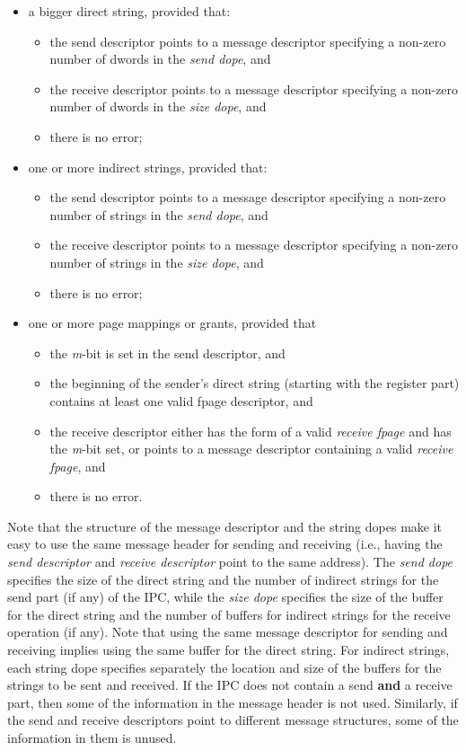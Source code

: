 \begin{itemize}

\item a bigger direct string, provided that:
\begin{itemize}
\item the send descriptor points to a  message descriptor  specifying a
     non-zero number of dwords in the \emph{send dope}, and
\item the receive descriptor points to a message descriptor specifying a
     non-zero number of dwords in the \emph{size dope}, and
\item there is no error;
\end{itemize}

\item one or more indirect strings, provided that:
\begin{itemize}
\item the send descriptor points to a  message descriptor specifying a
     non-zero number of strings in the \emph{send dope}, and
\item the receive descriptor points to a message descriptor specifying a
     non-zero number of strings in the \emph{size dope}, and
\item there is no error;
\end{itemize}

\item one or more page mappings or grants, provided that
\begin{itemize}
\item the \emph{m}-bit is set in the send descriptor, and
\item the beginning of the sender's direct string (starting with the
     register part) contains at least one valid fpage descriptor, and
\item the receive descriptor either has the form of a valid \emph{receive
     fpage} and has the \emph{m}-bit set, or points to a message
     descriptor containing a valid \emph{receive fpage}, and
\item there is no error.
\end{itemize}
\end{itemize}

Note that the structure of the message descriptor and the string dopes
make it easy to use the same message header for sending and receiving
(i.e., having the \emph{send descriptor} and \emph{receive descriptor}
point to the same address). The \emph{send dope} specifies the size of
the direct string and the number of indirect strings for the send part
(if any) of the IPC, while the \emph{size dope} specifies the size of
the buffer for the direct string and the number of buffers for indirect
strings for the receive operation (if any). Note that using the same
message descriptor for sending and receiving implies using the same
buffer for the direct string. For indirect strings, each string dope
specifies separately the location and size of the buffers for the
strings to be sent and received. If the IPC does not contain a send
\textbf{and} a receive part, then some of the information in the message
header is not used. Similarly, if the send and receive descriptors point
to different message structures, some of the information in them is unused.

